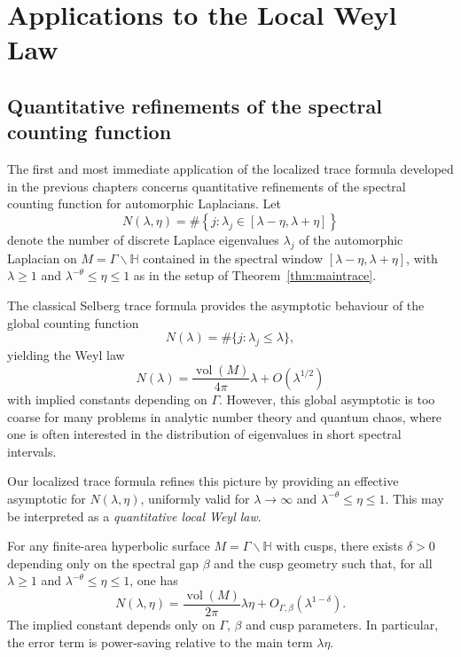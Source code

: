 \section{Applications to the Local Weyl Law}

\subsection{Quantitative refinements of the spectral counting function}

The first and most immediate application of the localized trace formula developed in the previous chapters concerns quantitative refinements of the spectral counting function for automorphic Laplacians. Let
\[
N(\lambda,\eta) = \# \left\{ j : \lambda_j \in [\lambda - \eta, \lambda + \eta] \right\}
\]
denote the number of discrete Laplace eigenvalues $\lambda_j$ of the automorphic Laplacian on $M = \Gamma \backslash \mathbb{H}$ contained in the spectral window $[\lambda - \eta, \lambda + \eta]$, with $\lambda \geq 1$ and $\lambda^{-\theta} \leq \eta \leq 1$ as in the setup of Theorem~\ref{thm:maintrace}.

The classical Selberg trace formula provides the asymptotic behaviour of the global counting function
\[
N(\lambda) = \#\{ j : \lambda_j \leq \lambda \},
\]
yielding the Weyl law
\[
N(\lambda) = \frac{\operatorname{vol}(M)}{4\pi} \lambda + O(\lambda^{1/2})
\]
with implied constants depending on $\Gamma$. However, this global asymptotic is too coarse for many problems in analytic number theory and quantum chaos, where one is often interested in the distribution of eigenvalues in short spectral intervals. 

Our localized trace formula refines this picture by providing an effective asymptotic for $N(\lambda,\eta)$, uniformly valid for $\lambda \to \infty$ and $\lambda^{-\theta} \leq \eta \leq 1$. This may be interpreted as a \emph{quantitative local Weyl law}.

\begin{theorem}\label{thm:localweyl}
For any finite-area hyperbolic surface $M = \Gamma \backslash \mathbb{H}$ with cusps, there exists $\delta > 0$ depending only on the spectral gap $\beta$ and the cusp geometry such that, for all $\lambda \geq 1$ and $\lambda^{-\theta} \leq \eta \leq 1$, one has
\[
N(\lambda,\eta) = \frac{\operatorname{vol}(M)}{2\pi} \lambda \eta + O_{\Gamma,\beta}\!\left( \lambda^{1-\delta} \right).
\]
The implied constant depends only on $\Gamma$, $\beta$ and cusp parameters. In particular, the error term is power-saving relative to the main term $\lambda \eta$.
\end{theorem}

